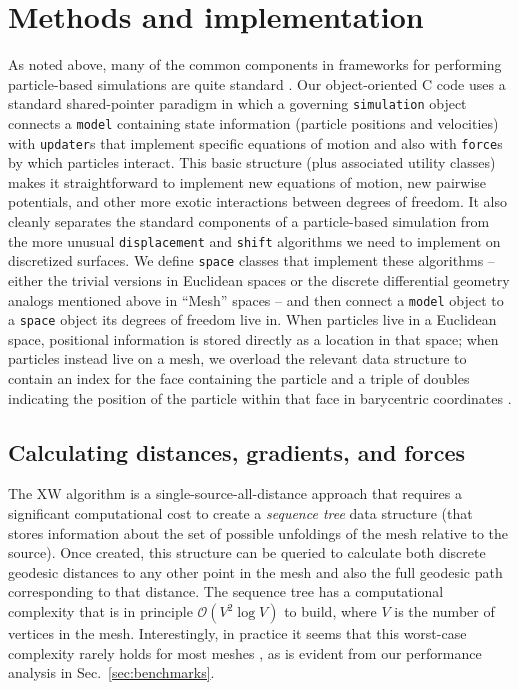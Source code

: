 \documentclass[preprint,12pt]{elsarticle}
\newcommand\CC{C\nolinebreak[4]\hspace{-.05em}\raisebox{.4ex}{\relsize{-3}{\textbf{++}}}}
\begin{document}
\section{Methods and implementation}\label{sec:methods}

As noted above,  many of  the common components in frameworks for performing particle-based simulations are quite standard \cite{frenkel2023understanding}.
Our object-oriented \CC{} code  uses a standard shared-pointer paradigm in which a governing \verb+simulation+ object connects  a  \verb+model+ containing state information (particle positions and velocities) with \verb+updater+s that implement specific equations of motion and  also with \verb+force+s by which particles interact.
This basic structure (plus associated  utility classes) makes it straightforward to implement new equations of motion, new pairwise potentials, and other more exotic interactions between degrees of freedom.
It also cleanly separates the standard components of a particle-based simulation from the more unusual \verb+displacement+ and \verb+shift+ algorithms we  need to implement on discretized surfaces.
We define \verb+space+ classes that implement these algorithms -- either the trivial versions in Euclidean spaces or the discrete differential geometry analogs mentioned above in ``Mesh'' spaces -- and then connect a  \verb+model+ object to a \verb+space+ object its degrees of freedom live in.
When particles live in a Euclidean space,  positional information is stored directly as a location in that space; when particles instead live on a mesh, we overload the relevant data structure to contain an index for the face containing the particle and a triple of doubles indicating the position of the particle within that face in barycentric coordinates \cite{crane2018discrete}.


\subsection{Calculating distances, gradients, and forces}\label{sec:xwgeodesic}

The XW algorithm is a single-source-all-distance approach that requires a significant  computational cost to create a \emph{sequence tree} data structure (that stores information about the set of possible unfoldings of the mesh relative to the source). Once created, this structure can be queried to calculate both discrete geodesic distances to any other point in the mesh and also the full geodesic path corresponding to that distance. The sequence tree has a computational complexity that is in principle $\mathcal{O}(V^2 \log V)$ to build, where $V$ is the number of vertices in the mesh. Interestingly, in practice it seems that this worst-case complexity rarely holds for most meshes \cite{xin2009improving}, as is evident from our performance analysis in Sec.~\ref{sec:benchmarks}.
\end{document}
